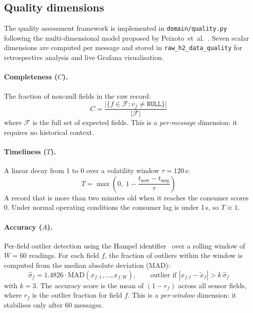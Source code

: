 \subsection{Quality dimensions}
\label{subsec:quality-dims}

The quality assessment framework is implemented in \texttt{domain/quality.py}
following the multi-dimensional model proposed by Peixoto~et~al.~\cite{peixoto2025}.
Seven scalar dimensions are computed per message and stored in
\texttt{raw\_h2\_data\_quality} for retrospective analysis and live
Grafana visualisation.

\paragraph{Completeness ($C$).}
The fraction of non-null fields in the raw record:
\begin{equation}
  C = \frac{|\{f \in \mathcal{F} : v_f \neq \texttt{NULL}\}|}{|\mathcal{F}|}
  \label{eq:completeness}
\end{equation}
where $\mathcal{F}$ is the full set of expected fields.
This is a \emph{per-message} dimension: it requires no historical context.

\paragraph{Timeliness ($T$).}
A linear decay from 1 to 0 over a volatility window $\tau = 120$\,s:
\begin{equation}
  T = \max\!\left(0,\; 1 - \frac{t_{\text{now}} - t_{\text{msg}}}{\tau}\right)
  \label{eq:timeliness}
\end{equation}
A record that is more than two minutes old when it reaches the consumer
scores 0. Under normal operating conditions the consumer lag is under 1\,s,
so $T \approx 1$.

\paragraph{Accuracy ($A$).}
Per-field outlier detection using the Hampel identifier~\cite{hampel1974}
over a rolling window of $W = 60$ readings.
For each field $f$, the fraction of outliers within the window is computed
from the median absolute deviation (MAD):
\begin{equation}
  \hat{\sigma}_f = 1.4826 \cdot \text{MAD}(x_{f,1},\ldots,x_{f,W}),
  \qquad
  \text{outlier if } |x_{f,t} - \tilde{x}_f| > k\,\hat{\sigma}_f
  \label{eq:hampel}
\end{equation}
with $k = 3$. The accuracy score is the mean of $(1 - r_f)$ across all
sensor fields, where $r_f$ is the outlier fraction for field $f$.
This is a \emph{per-window} dimension: it stabilises only after 60 messages.

